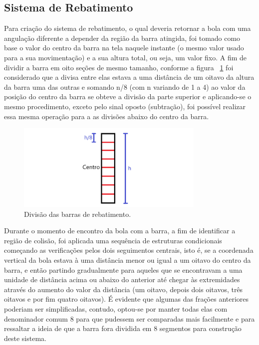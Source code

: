 \documentclass[conference]{IEEEtran}
\newcommand\largurafig{9cm}
\begin{document}
\subsection{Sistema de Rebatimento}
Para criação do sistema de rebatimento, o qual deveria retornar a bola com uma angulação diferente a depender da região da barra atingida, foi tomado como base o valor do centro da barra na tela naquele instante (o mesmo valor usado para a sua movimentação) e a sua altura total, ou seja, um valor fixo. A fim de dividir a barra em oito seções de mesmo tamanho, conforme a figura ~\ref{fig:barra_dividida} foi considerado que a divisa entre elas estava a uma distância de um oitavo da altura da barra uma das outras e somando n/8 (com n variando de 1 a 4) ao valor da posição do centro da barra se obteve a divisão da parte superior e aplicando-se o mesmo procedimento, exceto pelo sinal oposto (subtração), foi possível realizar essa mesma operação para a as divisões abaixo do centro da barra.

\begin{figure}[htbp]
\centerline{
    \includegraphics[width = \largurafig]{images/barra_dividida.png}
    }
\caption{Divisão das barras de rebatimento.}
\label{fig:barra_dividida}
\end{figure}

Durante o momento de encontro da bola com a barra, a fim de identificar a região de colisão, foi aplicada uma sequência de estruturas condicionais começando as verificações pelos dois seguimentos centrais, isto é, se a coordenada vertical da bola estava à uma distância menor ou igual a um oitavo do centro da barra, e então partindo gradualmente para aqueles que se encontravam a uma unidade de distância acima ou abaixo do anterior até chegar às extremidades através do aumento do valor da distância (um oitavo, depois dois oitavos, três oitavos e por fim quatro oitavos). É evidente que algumas das frações anteriores poderiam ser simplificadas, contudo, optou-se por manter todas elas com denominador comum 8 para que pudessem ser comparadas mais facilmente e para ressaltar a ideia de que a barra fora dividida em 8 segmentos para construção deste sistema.
\end{document}
